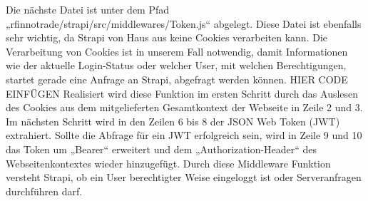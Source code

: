 Die nächste Datei ist unter dem Pfad „rfinnotrade/strapi/src/middlewares/Token.js“ abgelegt.
Diese Datei ist ebenfalls sehr wichtig, da Strapi von Haus aus keine Cookies verarbeiten kann. Die Verarbeitung von Cookies ist in unserem Fall notwendig, damit Informationen wie der aktuelle Login-Status oder welcher User, mit welchen Berechtigungen, startet gerade eine Anfrage an Strapi, abgefragt werden können.
HIER CODE EINFÜGEN
Realisiert wird diese Funktion im ersten Schritt durch das Auslesen des Cookies aus dem mitgelieferten Gesamtkontext der Webseite in Zeile 2 und 3. Im nächsten Schritt wird in den Zeilen 6 bis 8 der JSON Web Token (JWT) extrahiert. Sollte die Abfrage für ein JWT erfolgreich sein, wird in Zeile 9 und 10 das Token um „Bearer“ erweitert und dem „Authorization-Header“ des Webseitenkontextes wieder hinzugefügt.
Durch diese Middleware Funktion versteht Strapi, ob ein User berechtigter Weise eingeloggt ist oder Serveranfragen durchführen darf.